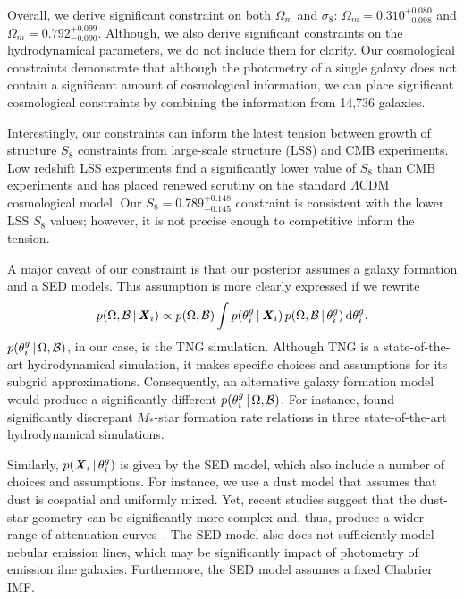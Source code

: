 Overall, we derive significant constraint on both $\Omega_m$ and $\sigma_8$: 
$\Omega_m = 0.310^{+0.080}_{-0.098}$ and $\Omega_m = 0.792^{+0.099}_{-0.090}$. 
Although, we also derive significant constraints on the hydrodynamical
parameters, we do not include them for clarity.  
Our cosmological constraints demonstrate that although the photometry of a
single galaxy does not contain a significant amount of cosmological
information, we can place significant cosmological constraints by combining the
information from 14,736 galaxies. 

Interestingly, our constraints can inform the latest tension between growth of
structure $S_8$ constraints from large-scale structure (LSS) and CMB
experiments. 
Low redshift LSS experiments find a significantly lower value of $S_8$ than CMB
experiments and has placed renewed scrutiny on the standard
$\Lambda$CDM cosmological model.
Our $S_8 = 0.789^{+0.148}_{-0.145}$ constraint is consistent with the lower LSS
$S_8$ values; however, it is not precise enough to competitive inform the
tension. 

A major caveat of our constraint is that our posterior assumes a galaxy
formation and a SED models. 
This assumption is more clearly expressed if we rewrite 
\begin{equation}
    p(\Omega, \mathcal{B}\,|\, {\textbf{\textit{X}}_i}) \propto p(\Omega, \mathcal{B}) \int     p(\theta^g_i \,|\, {\textbf{\textit{X}}_i})\, p(\Omega, \mathcal{B}\,|\, \theta^g_i)\,
    {\rm d}\theta^g_i.
\end{equation}
$p(\theta^g_i\,|\,\Omega, \mathcal{B})$, in our case, is the TNG simulation. 
Although TNG is a state-of-the-art hydrodynamical simulation, it makes specific
choices and assumptions for its subgrid approximations. 
Consequently, an alternative galaxy formation model would produce a
significantly different $p(\theta^g_i\,|\,\Omega, \mathcal{B})$. 
For instance, \cite{hahn2019} found significantly discrepant $M_*$-star
formation rate relations in three state-of-the-art hydrodynamical
simulations.

Similarly, $p({\textbf{\textit{X}}_i}\,|\,\theta^g_i)$ is given by the SED model, which
also include a number of choices and assumptions. 
For instance, we use a dust model that assumes that dust is cospatial and
uniformly mixed. 
Yet, recent studies suggest that the dust-star geometry can be significantly
more complex and, thus, produce a wider range of attenuation
curves~\citep{narayanan2018a, hahn2021}. 
The SED model also does not sufficiently model nebular emission lines,
which may be significantly impact of photometry of emission ilne galaxies. 
Furthermore, the SED model assumes a fixed Chabrier IMF.  

